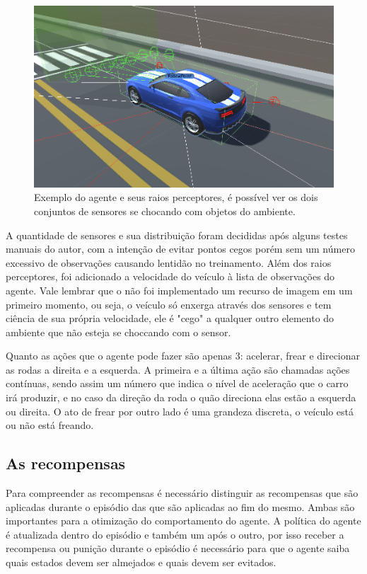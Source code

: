  \begin{figure}[h]
   \centering
   \includegraphics[width=15cm]{figs/agente-raios-checkpoint.png}
    \caption{Exemplo do agente e seus raios perceptores, é possível ver os dois conjuntos de sensores se chocando com objetos do ambiente.}
    \label{fig:casting-rays}
 \end{figure}

A quantidade de sensores e sua distribuição foram decididas após alguns testes manuais do autor, com a intenção de evitar pontos cegos porém sem um número excessivo de observações causando lentidão no treinamento. Além dos raios perceptores, foi adicionado a velocidade do veículo à lista de observações do agente. Vale lembrar que o não foi implementado um recurso de imagem em um primeiro momento, ou seja, o veículo só enxerga através dos sensores e tem ciência de sua própria velocidade, ele é "cego"{} a qualquer outro elemento do ambiente que não esteja se choccando com o sensor.

Quanto as ações que o agente pode fazer são apenas 3: acelerar, frear e direcionar as rodas a direita e a esquerda. A primeira e a última ação são chamadas ações contínuas, sendo assim um número que indica o nível de aceleração que o carro irá produzir, e no caso da direção da roda o quão direciona elas estão a esquerda ou direita. O ato de frear por outro lado é uma grandeza discreta, o veículo está ou não está freando.

\subsection{As recompensas}
Para compreender as recompensas é necessário distinguir as recompensas que são aplicadas durante o episódio das que são aplicadas ao fim do mesmo. Ambas são importantes para a otimização do comportamento do agente. A política do agente é atualizada dentro do episódio e também um após o outro, por isso receber a recompensa ou punição durante o episódio é necessário para que o agente saiba quais estados devem ser almejados e quais devem ser evitados.

